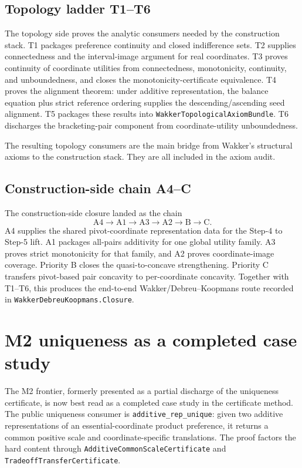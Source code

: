 \documentclass[11pt,english]{article}
\begin{document}
\subsection{Topology ladder T1--T6}

The topology side proves the analytic consumers needed by the construction stack.  T1 packages preference continuity and closed indifference sets.  T2 supplies connectedness and the interval-image argument for real coordinates.  T3 proves continuity of coordinate utilities from connectedness, monotonicity, continuity, and unboundedness, and closes the monotonicity-certificate equivalence.  T4 proves the alignment theorem: under additive representation, the balance equation plus strict reference ordering supplies the descending/ascending seed alignment.  T5 packages these results into \texttt{WakkerTopologicalAxiomBundle}.  T6 discharges the bracketing-pair component from coordinate-utility unboundedness.

The resulting topology consumers are the main bridge from Wakker's structural axioms to the construction stack.  They are all included in the axiom audit.

\subsection{Construction-side chain A4--C}

The construction-side closure landed as the chain
\[
\mathrm{A4} \to \mathrm{A1} \to \mathrm{A3} \to \mathrm{A2} \to \mathrm{B} \to \mathrm{C}.
\]
A4 supplies the shared pivot-coordinate representation data for the Step-4 to Step-5 lift.  A1 packages all-pairs additivity for one global utility family.  A3 proves strict monotonicity for that family, and A2 proves coordinate-image coverage.  Priority B closes the quasi-to-concave strengthening.  Priority C transfers pivot-based pair concavity to per-coordinate concavity.  Together with T1--T6, this produces the end-to-end Wakker/Debreu--Koopmans route recorded in \texttt{WakkerDebreuKoopmans.Closure}.

\section{M2 uniqueness as a completed case study}
\label{sec:m2}

The M2 frontier, formerly presented as a partial discharge of the uniqueness certificate, is now best read as a completed case study in the certificate method.  The public uniqueness consumer is \texttt{additive\_rep\_unique}: given two additive representations of an essential-coordinate product preference, it returns a common positive scale and coordinate-specific translations.  The proof factors the hard content through \texttt{AdditiveCommonScaleCertificate} and \texttt{TradeoffTransferCertificate}.
\end{document}

